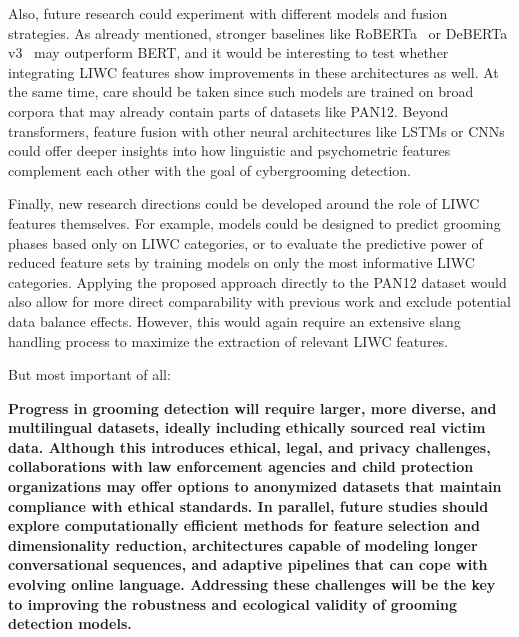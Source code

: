 Also, future research could experiment with different models and fusion strategies. As already mentioned, stronger baselines like RoBERTa~\cite{liu2019roberta} or DeBERTa v3~\cite{he2023debertav3} may outperform BERT, and it would be interesting to test whether integrating LIWC features show improvements in these architectures as well. At the same time, care should be taken since such models are trained on broad corpora that may already contain parts of datasets like PAN12. Beyond transformers, feature fusion with other neural architectures like LSTMs or CNNs could offer deeper insights into how linguistic and psychometric features complement each other with the goal of cybergrooming detection.  

Finally, new research directions could be developed around the role of LIWC features themselves. For example, models could be designed to predict grooming phases based only on LIWC categories, or to evaluate the predictive power of reduced feature sets by training models on only the most informative LIWC categories. Applying the proposed approach directly to the PAN12 dataset would also allow for more direct comparability with previous work and exclude potential data balance effects. However, this would again require an extensive slang handling process to maximize the extraction of relevant LIWC features.

But most important of all:
 
\textbf{Progress in grooming detection will require larger, more diverse, and multilingual datasets, ideally including ethically sourced real victim data. Although this introduces ethical, legal, and privacy challenges, collaborations with law enforcement agencies and child protection organizations may offer options to anonymized datasets that maintain compliance with ethical standards. In parallel, future studies should explore computationally efficient methods for feature selection and dimensionality reduction, architectures capable of modeling longer conversational sequences, and adaptive pipelines that can cope with evolving online language. Addressing these challenges will be the key to improving the robustness and ecological validity of grooming detection models.}  








